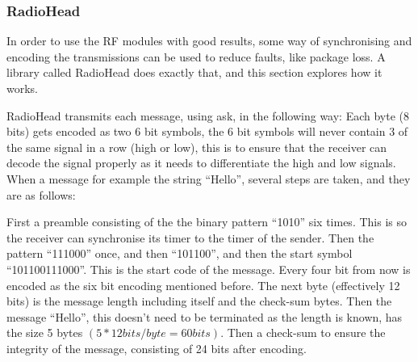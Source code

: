 \subsubsection{RadioHead}\label{subsubsec:RadioHead}

In order to use the RF modules with good results, some way of synchronising and encoding the transmissions can be used to reduce faults, like package loss.
A library called RadioHead does exactly that, and this section explores how it works.

RadioHead transmits each message, using \gls{ask}, in the following way:
Each byte (8 bits) gets encoded as two 6 bit symbols, the 6 bit symbols will never contain 3 of the same signal in a row (high or low), this is to ensure that the receiver can decode the signal properly as it needs to differentiate the high and low signals.
When a message for example the string \enquote{Hello}, several steps are taken, and they are as follows:

First a preamble consisting of the the binary pattern \enquote{1010} six times. 
This is so the receiver can synchronise its timer to the timer of the sender.
Then the pattern \enquote{111000} once, and then \enquote{101100}, and then the start symbol \enquote{101100111000}. 
This is the start code of the message. 
Every four bit from now is encoded as the six bit encoding mentioned before.
The next byte (effectively 12 bits) is the message length including itself and the check-sum bytes.
Then the message \enquote{Hello}, this doesn't need to be terminated as the length is known, has the size 5 bytes $(5 * 12 bits/byte = 60 bits)$.
Then a check-sum to ensure the integrity of the message, consisting of 24 bits after encoding.

